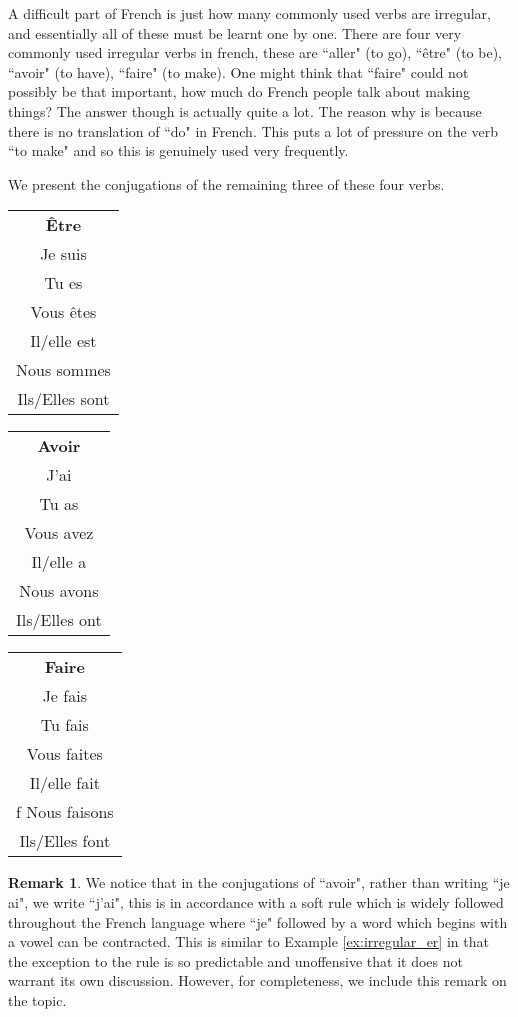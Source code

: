 \documentclass[12pt]{article}
\theoremstyle{plain}
\theoremstyle{definition}
\newtheorem{remark}[thm]{Remark}
\begin{document}
	A difficult part of French is just how many commonly used verbs are irregular, and essentially all of these must be learnt one by one. There are four very commonly used irregular verbs in french, these are ``aller" (to go), ``être" (to be), ``avoir" (to have), ``faire" (to make). One might think that ``faire" could not possibly be that important, how much do French people talk about making things? The answer though is actually quite a lot. The reason why is because there is no translation of ``do" in French. This puts a lot of pressure on the verb ``to make" and so this is genuinely used very frequently.
	
	We present the conjugations of the remaining three of these four verbs.
	\begin{center}
		\begin{tabular}{|c|}
			\hline
			\textbf{Être}\\
			Je suis\\
			Tu es\\
			Vous êtes\\
			Il/elle est\\
			Nous sommes\\
			Ils/Elles sont\\
			\hline
			\end{tabular}
		\begin{tabular}{|c|}
			\hline
			\textbf{Avoir}\\
			J'ai\\
			Tu as\\
			Vous avez\\
			Il/elle a\\
			Nous avons\\
			Ils/Elles ont\\
			\hline
		\end{tabular}
	\begin{tabular}{|c|}
		\hline
		\textbf{Faire}\\
		Je fais\\
		Tu fais\\
		Vous faites\\
		Il/elle fait\\f
		Nous faisons\\
		Ils/Elles font\\
		\hline
	\end{tabular}
		\end{center}
	\begin{remark}
		We notice that in the conjugations of ``avoir", rather than writing ``je ai", we write ``j'ai", this is in accordance with a soft rule which is widely followed throughout the French language where ``je" followed by a word which begins with a vowel can be contracted. This is similar to Example \ref{ex:irregular_er} in that the exception to the rule is so predictable and unoffensive that it does not warrant its own discussion. However, for completeness, we include this remark on the topic.
		\end{remark}
\end{document}
